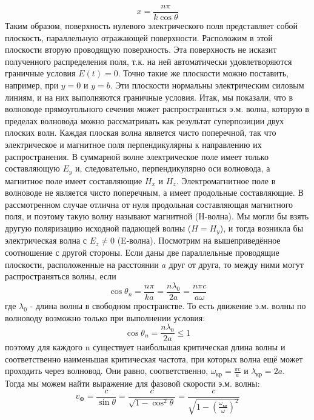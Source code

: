\documentclass[a4paper,12pt]{article}
\begin{document}
\begin{equation}
    x = \frac{n \pi}{k \cos \theta}
\end{equation}
Таким образом, поверхность нулевого электрического поля представляет собой плоскость, параллельную отражающей поверхности. Расположим в этой плоскости вторую проводящую поверхность. Эта поверхность не исказит полученного распределения поля, т.к. на ней автоматически удовлетворяются граничные условия $E(t) = 0$. Точно такие же плоскости
можно поставить, например, при $y = 0$ и $y = b$. Эти плоскости нормальны электрическим силовым линиям, и на них выполняются граничные
условия.
Итак, мы показали, что в волноводе прямоугольного сечения может распространяться э.м. волна, которую в пределах волновода можно рассматривать как результат суперпозиции двух плоских волн. Каждая плоская волна является чисто поперечной, так что электрическое и магнитное поля перпендикулярны к направлению их распространения.
В суммарной волне электрическое поле имеет только составляющую $E_y$ и, следовательно, перпендикулярно оси волновода, а магнитное поле имеет составляющие $H_x$ и $H_z$. Электромагнитное поле в волноводе не является чисто поперечным, а имеет продольные составляющие. В рассмотренном случае отлична от нуля продольная составляющая магнитного поля, и поэтому такую волну называют магнитной (H-волна). Мы могли бы взять другую поляризацию исходной падающей волны ($H = H_y$), и тогда возникла бы электрическая волна с $E_z \neq 0$ (E-волна). Посмотрим на вышеприведённое соотношение с другой стороны. Если даны две параллельные проводящие плоскости, расположенные на расстоянии $a$ друг от друга, то между ними могут распространяться волны, если
\begin{equation}
    \cos \theta_n = \frac{n \pi}{k a} = \frac{n \lambda_0}{2 a} = \frac{n \pi c}{a \omega}
\end{equation}
где $\lambda_0$ - длина волны в свободном пространстве. То есть движение э.м. волны по волноводу возможно только при выполнении условия:
\begin{equation}
    \cos \theta_n = \frac{n \lambda_0}{2 a} \leq 1
\end{equation}
поэтому для каждого n существует наибольшая критическая длина волны и соответственно наименьшая критическая частота, при которых волна ещё может проходить через волновод. Они равно, соответственно, $\omega_{\text{кр}} = \frac{\pi c}{a}$ и $\lambda_{\text{кр}} = 2a$.\\
Тогда мы можем найти выражение для фазовой скорости э.м. волны:
\begin{equation}
    v_{\text{Ф}} = \frac{c}{\sin \theta} = \frac{c}{\sqrt{1-\cos^2 \theta}} = \frac{c}{\sqrt{1 - \left(\frac{\omega_{\text{кр}}}{\omega}\right)^2}}
\end{equation}
\end{document}
